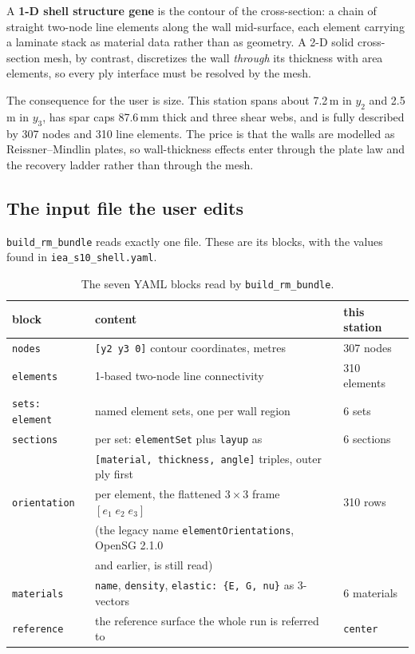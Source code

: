 A \textbf{1-D shell structure gene} is the contour of the cross-section: a chain
of straight two-node line elements along the wall mid-surface, each element
carrying a laminate stack as material data rather than as geometry. A 2-D solid
cross-section mesh, by contrast, discretizes the wall \emph{through} its
thickness with area elements, so every ply interface must be resolved by the
mesh.

The consequence for the user is size. This station spans about 7.2\,m in $y_2$
and 2.5\,m in $y_3$, has spar caps 87.6\,mm thick and three shear webs, and is
fully described by 307 nodes and 310 line elements. The price is that the walls
are modelled as Reissner--Mindlin plates, so wall-thickness effects enter through
the plate law and the recovery ladder rather than through the mesh.

\subsection{The input file the user edits}

\texttt{build\_rm\_bundle} reads exactly one file. These are its blocks, with the
values found in \texttt{iea\_s10\_shell.yaml}.

\begin{table}[htbp]
\centering
\small
\begin{tabular}{lll}
\toprule
block & content & this station \\
\midrule
\texttt{nodes} & \texttt{[y2 y3 0]} contour coordinates, metres & 307 nodes \\
\texttt{elements} & 1-based two-node line connectivity & 310 elements \\
\texttt{sets: element} & named element sets, one per wall region & 6 sets \\
\texttt{sections} & per set: \texttt{elementSet} plus \texttt{layup} as & 6 sections \\
                  & \texttt{[material, thickness, angle]} triples, outer ply first & \\
\texttt{orientation} & per element, the flattened $3\times3$ frame $[e_1\;e_2\;e_3]$ & 310 rows \\
                    & (the legacy name \texttt{elementOrientations}, OpenSG 2.1.0 & \\
                    & and earlier, is still read) & \\
\texttt{materials} & \texttt{name}, \texttt{density}, \texttt{elastic: \{E, G, nu\}} as 3-vectors & 6 materials \\
\texttt{reference} & the reference surface the whole run is referred to & \texttt{center} \\
\bottomrule
\end{tabular}
\caption{The seven YAML blocks read by \texttt{build\_rm\_bundle}.}
\label{tab:shell-yaml-blocks}
\end{table}

